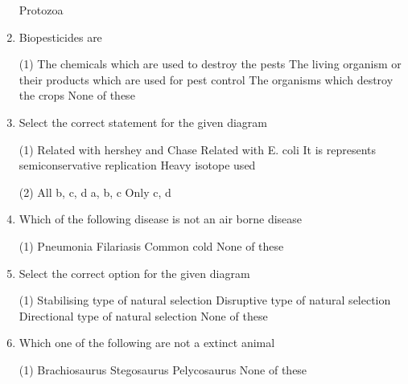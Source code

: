\documentclass[twocolumn]{article}
\begin{document}
\begin{enumerate}
\begin{tasks}
        \task Protozoa
    \end{tasks}
    \item Biopesticides are
    \begin{tasks}(1)
        \task The chemicals which are used to destroy the pests
        \task The living organism or their products which are used for pest control
        \task The organisms which destroy the crops
        \task None of these
    \end{tasks}
    \item Select the correct statement for the given diagram
    \begin{center}
    \end{center}
    \begin{tasks}(1)
        \task Related with hershey and Chase
        \task Related with E. coli
        \task It is represents semiconservative replication
        \task Heavy isotope used
    \end{tasks}
    \begin{tasks}(2)
        \task All
        \task b, c, d
        \task a, b, c
        \task Only c, d
    \end{tasks}
    \item Which of the following disease is not an air borne disease
    \begin{tasks}(1)
        \task Pneumonia
        \task Filariasis
        \task Common cold
        \task None of these
    \end{tasks}
    \item Select the correct option for the given diagram
    \begin{center}
    \end{center}
    \begin{tasks}(1)
        \task Stabilising type of natural selection
        \task Disruptive type of natural selection
        \task Directional type of natural selection
        \task None of these
    \end{tasks}
    \item Which one of the following are not a extinct animal
    \begin{tasks}(1)
        \task Brachiosaurus
        \task Stegosaurus
        \task Pelycosaurus
        \task None of these
    \end{tasks}


\end{enumerate}
\end{document}
